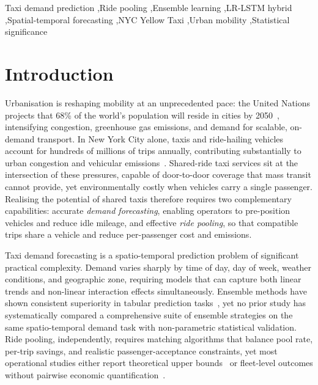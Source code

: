 \documentclass[a4paper,fleqn]{cas-dc}
\begin{document}
\begin{keywords}
Taxi demand prediction \sep Ride pooling \sep Ensemble learning \sep LR-LSTM hybrid \sep Spatial-temporal forecasting \sep NYC Yellow Taxi \sep Urban mobility \sep Statistical significance
\end{keywords}

\hypersetup{pageanchor=false}
\makeatletter
\let\Hy@tempa\@empty
\makeatother
\maketitle
\thispagestyle{empty}
\hypersetup{pageanchor=true}

\section{Introduction}

Urbanisation is reshaping mobility at an unprecedented pace: the United Nations projects that 68\% of the world's population will reside in cities by 2050~\cite{un2018wup}, intensifying congestion, greenhouse gas emissions, and demand for scalable, on-demand transport.  In New York City alone, taxis and ride-hailing vehicles account for hundreds of millions of trips annually, contributing substantially to urban congestion and vehicular emissions~\cite{taxinyc_dataset}.  Shared-ride taxi services sit at the intersection of these pressures, capable of door-to-door coverage that mass transit cannot provide, yet environmentally costly when vehicles carry a single passenger.  Realising the potential of shared taxis therefore requires two complementary capabilities: accurate \emph{demand forecasting}, enabling operators to pre-position vehicles and reduce idle mileage, and effective \emph{ride pooling}, so that compatible trips share a vehicle and reduce per-passenger cost and emissions.

Taxi demand forecasting is a spatio-temporal prediction problem of significant practical complexity.  Demand varies sharply by time of day, day of week, weather conditions, and geographic zone, requiring models that can capture both linear trends and non-linear interaction effects simultaneously.  Ensemble methods have shown consistent superiority in tabular prediction tasks~\cite{breiman2001rf,chen2016xgboost,wolpert1992stacking}, yet no prior study has systematically compared a comprehensive suite of ensemble strategies on the same spatio-temporal demand task with non-parametric statistical validation.  Ride pooling, independently, requires matching algorithms that balance pool rate, per-trip savings, and realistic passenger-acceptance constraints, yet most operational studies either report theoretical upper bounds~\cite{santi2014quantifying} or fleet-level outcomes without pairwise economic quantification~\cite{alonso2017demand}.
\end{document}
